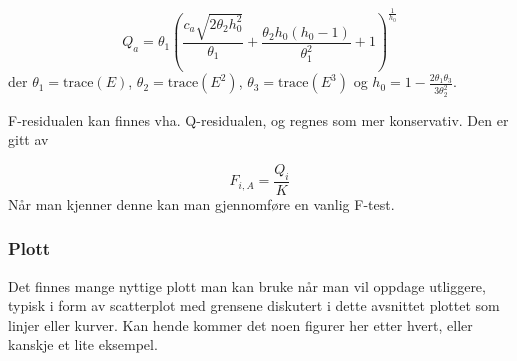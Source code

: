 \begin{equation}
Q_{a}=\theta_{1}\left(\frac{c_{a} \sqrt{2 \theta_{2} h_{0}^{2}}}{\theta_{1}}+\frac{\theta_{2} h_{0}\left(h_{0}-1\right)}{\theta_{1}^{2}}+1\right)^{\frac{1}{h_{0}}}
\end{equation}
der $\theta_1 = \textrm{trace}(E)$, $\theta_2 = \textrm{trace}(E^2)$, $\theta_3 = \textrm{trace}(E^3)$ og $h_0 = 1 - \frac{2 \theta_1 \theta_3}{3 \theta_2^2}$.

F-residualen kan finnes vha. Q-residualen, og regnes som mer konservativ. Den er gitt av

\begin{equation}
	F_{i, A} = \frac{Q_i}{K}
\end{equation}
Når man kjenner denne kan man gjennomføre en vanlig F-test.

\subsubsection{Plott}
Det finnes mange nyttige plott man kan bruke når man vil oppdage utliggere, typisk i form av scatterplot med grensene diskutert i dette avsnittet plottet som linjer eller kurver. Kan hende kommer det noen figurer her etter hvert, eller kanskje et lite eksempel.
